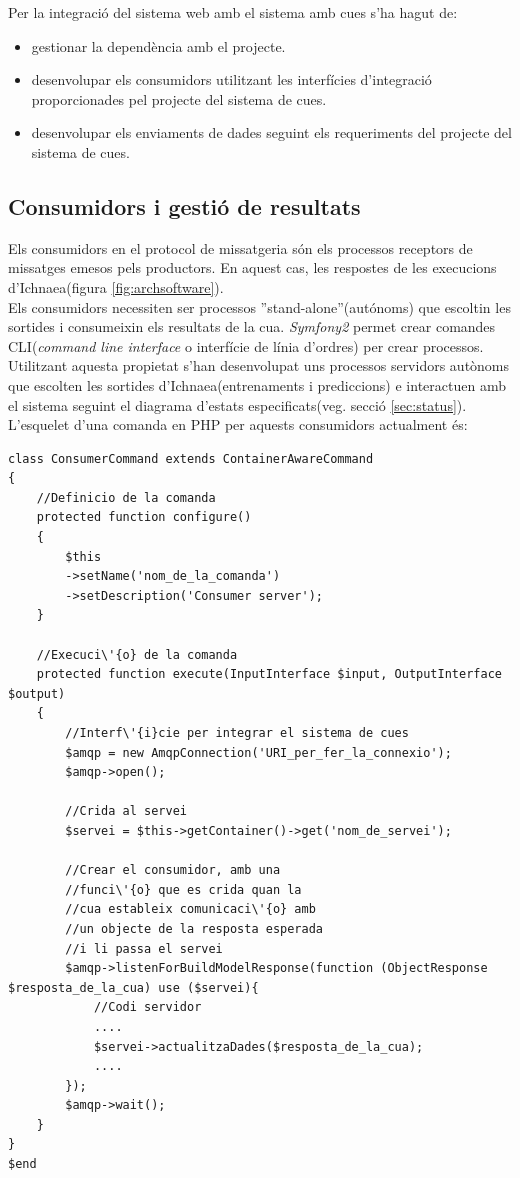 Per la integració del sistema web amb el sistema amb cues s'ha hagut de:
\begin{itemize}
\item gestionar la dependència amb el projecte.
\item desenvolupar els consumidors utilitzant les interfícies d'integració proporcionades pel projecte del sistema de cues.
\item desenvolupar els enviaments de dades seguint els requeriments del projecte del sistema de cues.
\end{itemize}

\subsection{Consumidors i gesti\'{o} de resultats}
Els consumidors en el protocol de missatgeria s\'{o}n els processos receptors de missatges emesos pels productors. En aquest cas, les respostes de les execucions d'Ichnaea(figura \ref{fig:archsoftware}).\\

Els consumidors necessiten ser processos ''stand-alone''(aut\'{o}noms) que escoltin les sortides i consumeixin els resultats de la cua. \textit{Symfony2} permet crear comandes CLI(\textit{command line interface} o interfície de línia d'ordres) per crear processos. Utilitzant aquesta propietat s'han desenvolupat uns processos servidors autònoms que escolten les sortides d'Ichnaea(entrenaments i prediccions) e interactuen amb el sistema seguint el diagrama d'estats especificats(veg. secció \ref{sec:status}).\\

L'esquelet d'una comanda en PHP per aquests consumidors actualment \'{e}s:
\begin{lstlisting}
class ConsumerCommand extends ContainerAwareCommand
{
	//Definicio de la comanda
	protected function configure()
	{
		$this
		->setName('nom_de_la_comanda')
		->setDescription('Consumer server');
	}
	
	//Execuci\'{o} de la comanda
	protected function execute(InputInterface $input, OutputInterface $output)
	{
		//Interf\'{i}cie per integrar el sistema de cues
		$amqp = new AmqpConnection('URI_per_fer_la_connexio');
		$amqp->open();
		
		//Crida al servei
		$servei = $this->getContainer()->get('nom_de_servei');
		
		//Crear el consumidor, amb una 
		//funci\'{o} que es crida quan la 
		//cua estableix comunicaci\'{o} amb 
		//un objecte de la resposta esperada 
		//i li passa el servei 
		$amqp->listenForBuildModelResponse(function (ObjectResponse $resposta_de_la_cua) use ($servei){
		 	//Codi servidor
		 	....
			$servei->actualitzaDades($resposta_de_la_cua);
			....
		});
		$amqp->wait();
	}
}
$end
\end{lstlisting}

